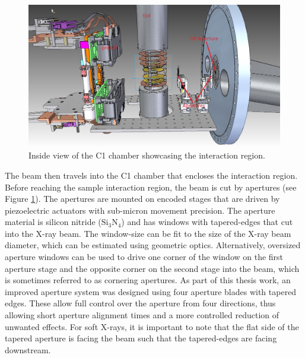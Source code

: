 \begin{figure}
	\centering
		\includegraphics[width=1.00\textwidth]{images/c1-ccd-spec.jpg}
	\caption{Inside view of the C1 chamber showcasing the interaction region.}
	\label{fig:c1-ccd-spec}
\end{figure}
The beam then travels into the C1 chamber that encloses the interaction region. Before reaching the sample interaction region, the beam is cut by apertures (see Figure \ref{fig:c1-ccd-spec}). The apertures are mounted on encoded stages that are driven by piezoelectric actuators with sub-micron movement precision. The aperture material is silicon nitride ($\text{Si}_{3}\text{N}_{4}$) and has windows with tapered-edges that cut into the X-ray beam. The window-size can be fit to the size of the X-ray beam diameter, which can be estimated using geometric optics. Alternatively, oversized aperture windows can be used to drive one corner of the window on the first aperture stage and the opposite corner on the second stage into the beam, which is sometimes referred to as cornering apertures. As part of this thesis work, an improved aperture system was designed using four aperture blades with tapered edges. These allow full control over the aperture from four directions, thus allowing short aperture alignment times and a more controlled reduction of unwanted effects. For soft X-rays, it is important to note that the flat side of the tapered aperture is facing the beam such that the tapered-edges are facing downstream.\\[1\baselineskip]
